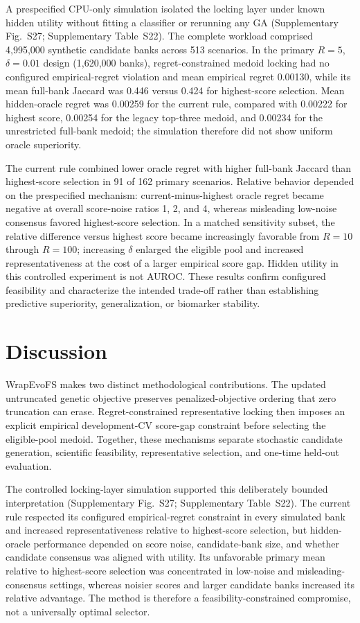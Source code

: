 A prespecified CPU-only simulation isolated the locking layer under known hidden utility without fitting a classifier or rerunning any GA (Supplementary Fig.~S27; Supplementary Table~S22). The complete workload comprised 4,995,000 synthetic candidate banks across 513 scenarios. In the primary $R=5$, $\delta=0.01$ design (1,620,000 banks), regret-constrained medoid locking had no configured empirical-regret violation and mean empirical regret 0.00130, while its mean full-bank Jaccard was 0.446 versus 0.424 for highest-score selection. Mean hidden-oracle regret was 0.00259 for the current rule, compared with 0.00222 for highest score, 0.00254 for the legacy top-three medoid, and 0.00234 for the unrestricted full-bank medoid; the simulation therefore did not show uniform oracle superiority.

The current rule combined lower oracle regret with higher full-bank Jaccard than highest-score selection in 91 of 162 primary scenarios. Relative behavior depended on the prespecified mechanism: current-minus-highest oracle regret became negative at overall score-noise ratios 1, 2, and 4, whereas misleading low-noise consensus favored highest-score selection. In a matched sensitivity subset, the relative difference versus highest score became increasingly favorable from $R=10$ through $R=100$; increasing $\delta$ enlarged the eligible pool and increased representativeness at the cost of a larger empirical score gap. Hidden utility in this controlled experiment is not AUROC. These results confirm configured feasibility and characterize the intended trade-off rather than establishing predictive superiority, generalization, or biomarker stability.

\FloatBarrier
\section{Discussion}

WrapEvoFS makes two distinct methodological contributions. The updated untruncated genetic objective preserves penalized-objective ordering that zero truncation can erase. Regret-constrained representative locking then imposes an explicit empirical development-CV score-gap constraint before selecting the eligible-pool medoid. Together, these mechanisms separate stochastic candidate generation, scientific feasibility, representative selection, and one-time held-out evaluation.

The controlled locking-layer simulation supported this deliberately bounded interpretation (Supplementary Fig.~S27; Supplementary Table~S22). The current rule respected its configured empirical-regret constraint in every simulated bank and increased representativeness relative to highest-score selection, but hidden-oracle performance depended on score noise, candidate-bank size, and whether candidate consensus was aligned with utility. Its unfavorable primary mean relative to highest-score selection was concentrated in low-noise and misleading-consensus settings, whereas noisier scores and larger candidate banks increased its relative advantage. The method is therefore a feasibility-constrained compromise, not a universally optimal selector.

